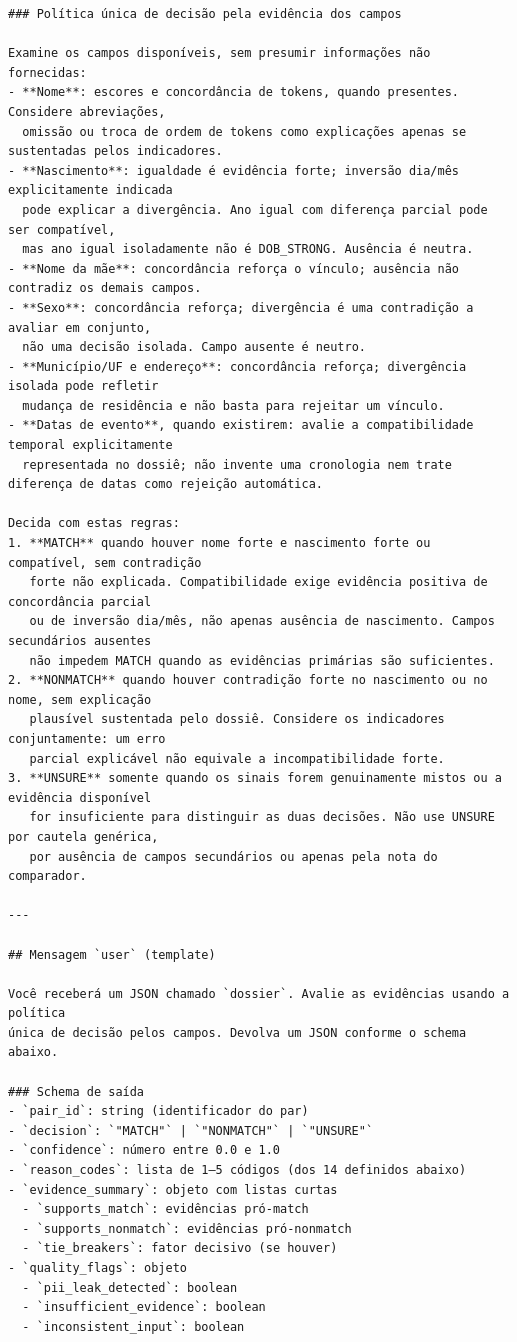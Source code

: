 {\begin{verbatim}
### Política única de decisão pela evidência dos campos

Examine os campos disponíveis, sem presumir informações não fornecidas:
- **Nome**: escores e concordância de tokens, quando presentes. Considere abreviações,
  omissão ou troca de ordem de tokens como explicações apenas se sustentadas pelos indicadores.
- **Nascimento**: igualdade é evidência forte; inversão dia/mês explicitamente indicada
  pode explicar a divergência. Ano igual com diferença parcial pode ser compatível,
  mas ano igual isoladamente não é DOB_STRONG. Ausência é neutra.
- **Nome da mãe**: concordância reforça o vínculo; ausência não contradiz os demais campos.
- **Sexo**: concordância reforça; divergência é uma contradição a avaliar em conjunto,
  não uma decisão isolada. Campo ausente é neutro.
- **Município/UF e endereço**: concordância reforça; divergência isolada pode refletir
  mudança de residência e não basta para rejeitar um vínculo.
- **Datas de evento**, quando existirem: avalie a compatibilidade temporal explicitamente
  representada no dossiê; não invente uma cronologia nem trate diferença de datas como rejeição automática.

Decida com estas regras:
1. **MATCH** quando houver nome forte e nascimento forte ou compatível, sem contradição
   forte não explicada. Compatibilidade exige evidência positiva de concordância parcial
   ou de inversão dia/mês, não apenas ausência de nascimento. Campos secundários ausentes
   não impedem MATCH quando as evidências primárias são suficientes.
2. **NONMATCH** quando houver contradição forte no nascimento ou no nome, sem explicação
   plausível sustentada pelo dossiê. Considere os indicadores conjuntamente: um erro
   parcial explicável não equivale a incompatibilidade forte.
3. **UNSURE** somente quando os sinais forem genuinamente mistos ou a evidência disponível
   for insuficiente para distinguir as duas decisões. Não use UNSURE por cautela genérica,
   por ausência de campos secundários ou apenas pela nota do comparador.

---

## Mensagem `user` (template)

Você receberá um JSON chamado `dossier`. Avalie as evidências usando a política
única de decisão pelos campos. Devolva um JSON conforme o schema abaixo.

### Schema de saída
- `pair_id`: string (identificador do par)
- `decision`: `"MATCH"` | `"NONMATCH"` | `"UNSURE"`
- `confidence`: número entre 0.0 e 1.0
- `reason_codes`: lista de 1–5 códigos (dos 14 definidos abaixo)
- `evidence_summary`: objeto com listas curtas
  - `supports_match`: evidências pró-match
  - `supports_nonmatch`: evidências pró-nonmatch
  - `tie_breakers`: fator decisivo (se houver)
- `quality_flags`: objeto
  - `pii_leak_detected`: boolean
  - `insufficient_evidence`: boolean
  - `inconsistent_input`: boolean


\end{verbatim}}
